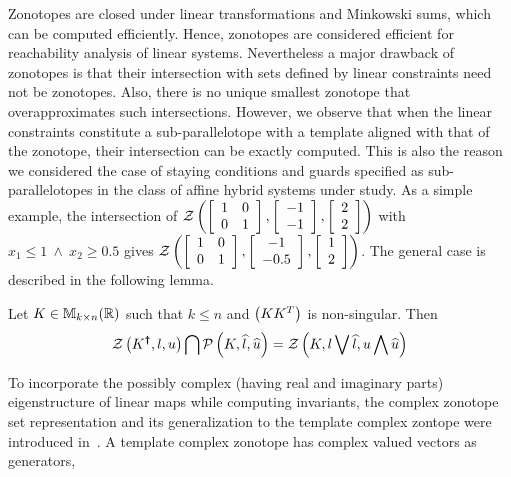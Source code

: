 Zonotopes are closed under linear transformations and Minkowski sums, which can be computed efficiently.  Hence, zonotopes are
considered efficient for reachability analysis of linear systems.  Nevertheless
a major drawback of zonotopes is that their intersection with sets defined by linear
constraints need not be zonotopes.  Also, there is no unique smallest
zonotope that overapproximates such intersections.  However, we observe that when the linear constraints
constitute a sub-parallelotope with a template aligned with that of
the zonotope, their intersection can be exactly computed.  This is
also the reason we considered the case of staying conditions and guards specified as sub-parallelotopes 
in the class of affine hybrid systems under study.  As a simple example, the intersection of
$\mathcal{Z}\left(\left[\begin{array}{l l}1 & 0 \\ 0 &
      1\end{array}\right],\left[\begin{array}{c}-1\\ -1\end{array}\right],\left[\begin{array}{c}2\\ 2\end{array}\right]\right)$
with $x_1\leq 1~\wedge~x_2\geq 0.5$ gives $\mathcal{Z}\left(\left[\begin{array}{l
        l}1 & 0 \\ 0 &
      1\end{array}\right],\left[\begin{array}{c}-1\\ -0.5\end{array}\right],\left[\begin{array}{c}1\\ 2\end{array}\right]\right)$.
The general case is described in the following lemma.
%
\begin{lemma}\label{lem:motivation}
Let $K\in\mathbb{M}_{k\times n}(\mathbb{R})$ such that $k\leq n$ and $\left(KK^T\right)$ is
non-singular.  Then
\[
\mathcal{Z}\left(K^{\bm{\dagger}},l,u\right) \bigcap \mathcal{P}\left(K,\widehat{l},\widehat{u}\right)
= \mathcal{Z}\left(K,l\bigvee \widehat{l},u\bigwedge \widehat{u}\right)
\]
\end{lemma}
%
To incorporate the possibly complex (having real and imaginary parts)
eigenstructure of linear maps while computing invariants, the complex
zonotope set representation and its generalization to the template
complex zontope were introduced in~\cite{adimoolam2016using,tcz2017}.
A template complex zonotope has complex valued vectors as generators,
